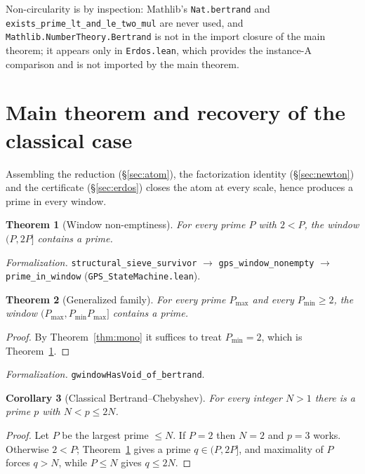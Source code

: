 \documentclass[11pt,a4paper]{amsart}
\theoremstyle{plain}
\newtheorem{theorem}{Theorem}[section]
\newtheorem{corollary}[theorem]{Corollary}
\theoremstyle{definition}
\theoremstyle{plain}
\theoremstyle{remark}
\newcommand{\lean}[1]{\textup{\texttt{#1}}}
\newcommand{\Formal}[1]{\par\smallskip\noindent\emph{Formalization.} #1\par\smallskip}
\begin{document}
Non-circularity is by inspection: Mathlib's \lean{Nat.bertrand} and
\lean{exists\_prime\_lt\_and\_le\_two\_mul} are never used, and
\lean{Mathlib.NumberTheory.Bertrand} is not in the import closure of the main theorem; it
appears only in \lean{Erdos.lean}, which provides the instance-A comparison and is not
imported by the main theorem.

\section{Main theorem and recovery of the classical case}
\label{sec:main}

Assembling the reduction (\S\ref{sec:atom}), the factorization identity (\S\ref{sec:newton})
and the certificate (\S\ref{sec:erdos}) closes the atom at every scale, hence produces a prime
in every window.

\begin{theorem}[Window non-emptiness]\label{thm:window}
For every prime $P$ with $2<P$, the window $(P,2P]$ contains a prime.
\end{theorem}

\Formal{\lean{structural\_sieve\_survivor} $\to$ \lean{gps\_window\_nonempty} $\to$
\lean{prime\_in\_window} (\lean{GPS\_StateMachine.lean}).}

\begin{theorem}[Generalized family]\label{thm:gen}
For every prime $P_{\max}$ and every $P_{\min}\ge2$, the window
$(P_{\max},P_{\min}P_{\max}]$ contains a prime.
\end{theorem}

\begin{proof}
By Theorem~\ref{thm:mono} it suffices to treat $P_{\min}=2$, which is
Theorem~\ref{thm:window}.
\end{proof}

\Formal{\lean{gwindowHasVoid\_of\_bertrand}.}

\begin{corollary}[Classical Bertrand--Chebyshev]\label{cor:classical}
For every integer $N>1$ there is a prime $p$ with $N<p\le2N$.
\end{corollary}

\begin{proof}
Let $P$ be the largest prime $\le N$. If $P=2$ then $N=2$ and $p=3$ works. Otherwise
$2<P$; Theorem~\ref{thm:window} gives a prime $q\in(P,2P]$, and maximality of $P$ forces
$q>N$, while $P\le N$ gives $q\le2N$.
\end{proof}
\end{document}
